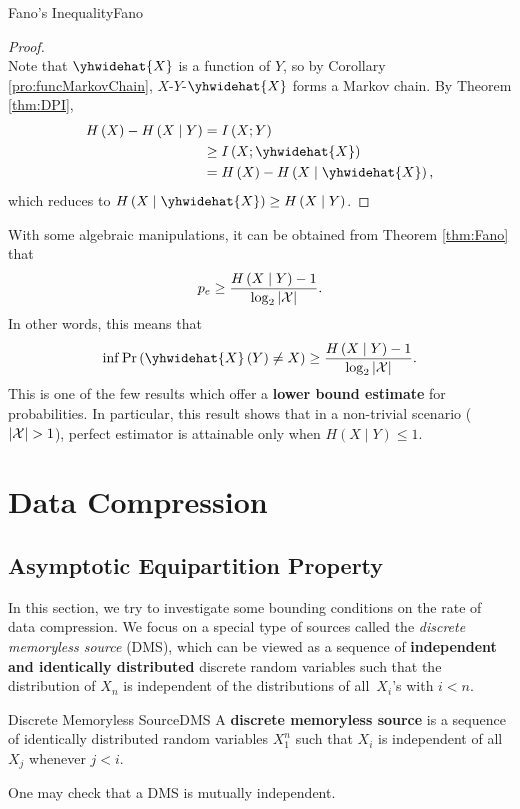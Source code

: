 \documentclass[math, code]{amznotes}
\theoremstyle{remark}
\begin{document}
\begin{thmbox}{Fano's Inequality}{Fano}
\begin{proof}
\begin{equation*}
        \end{equation*}
        Note that $\yhwidehat{X}$ is a function of $Y$, so by Corollary \ref{pro:funcMarkovChain}, $X$-$Y$-$\yhwidehat{X}$ forms a Markov chain. By Theorem \ref{thm:DPI}, 
        \begin{align*}
            H\left(X\right) - H\left(X \mid Y\right) & = I\left(X ; Y\right) \\
            & \geq I\left(X ; \yhwidehat{X}\right) \\
            & = H\left(X\right) - H\left(X \mid \yhwidehat{X}\right),
        \end{align*}
        which reduces to $H\left(X \mid \yhwidehat{X}\right) \geq H\left(X \mid Y\right)$.
    \end{proof}
\end{thmbox}
With some algebraic manipulations, it can be obtained from Theorem \ref{thm:Fano} that 
\begin{equation*}
    p_e \geq \frac{H\left(X \mid Y\right) - 1}{\log_2{\left\lvert {\mathcal{X}} \right\rvert}}.
\end{equation*}
In other words, this means that 
\begin{equation*}
    \inf \Pr\left(\yhwidehat{X}\left(Y\right) \neq X\right) \geq \frac{H\left(X \mid Y\right) - 1}{\log_2\abs{\mathcal{X}}}.
\end{equation*}
This is one of the few results which offer a \textbf{lower bound estimate} for probabilities. In particular, this result shows that in a non-trivial scenario (${\left\lvert {\mathcal{X}} \right\rvert} > 1$), perfect estimator is attainable only when $H\left(X \mid Y\right) \leq 1$. 

\chapter{Data Compression}
\section{Asymptotic Equipartition Property}
In this section, we try to investigate some bounding conditions on the rate of data compression. We focus on a special type of sources called the \textit{discrete memoryless source} (DMS), which can be viewed as a sequence of \textbf{independent and identically distributed} discrete random variables such that the distribution of $X_n$ is independent of the distributions of all~$X_i$'s with $i < n$. 
\begin{dfnbox}{Discrete Memoryless Source}{DMS}
    A {\color{red} \textbf{discrete memoryless source}} is a sequence of identically distributed random variables $X_1^n$ such that $X_i$ is independent of all $X_j$ whenever $j < i$.
\end{dfnbox}
One may check that a DMS is mutually independent.
\end{document}
